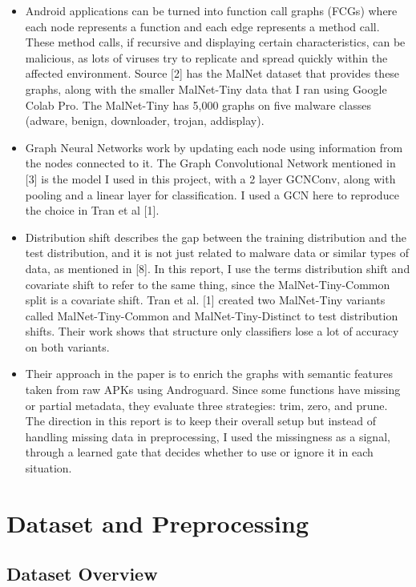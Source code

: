 \documentclass[12pt]{article}
\begin{document}
\begin{itemize}
    \item Android applications can be turned into function call graphs (FCGs) where each node represents a function and each edge represents a method call. These method calls, if recursive and displaying certain characteristics, can be malicious, as lots of viruses try to replicate and spread quickly within the affected environment. Source [2] has the MalNet dataset that provides these graphs, along with the smaller MalNet-Tiny data that I ran using Google Colab Pro. The MalNet-Tiny has 5,000 graphs on five malware classes (adware, benign, downloader, trojan, addisplay).
    \item Graph Neural Networks work by updating each node using information from the nodes connected to it. The Graph Convolutional Network mentioned in [3] is the model I used in this project, with a 2 layer GCNConv, along with pooling and a linear layer for classification. I used a GCN here to reproduce the choice in Tran et al [1].
    \item Distribution shift describes the gap between the training distribution and the test distribution, and it is not just related to malware data or similar types of data, as mentioned in [8]. In this report, I use the terms distribution shift and covariate shift to refer to the same thing, since the MalNet-Tiny-Common split is a covariate shift. Tran et al. [1] created two MalNet-Tiny variants called MalNet-Tiny-Common and MalNet-Tiny-Distinct to test distribution shifts. Their work shows that structure only classifiers lose a lot of accuracy on both variants.
    \item Their approach in the paper is to enrich the graphs with semantic features taken from raw APKs using Androguard. Since some functions have missing or partial metadata, they evaluate three strategies: trim, zero, and prune. The direction in this report is to keep their overall setup but instead of handling missing data in preprocessing, I used the missingness as a signal, through a learned gate that decides whether to use or ignore it in each situation. 
\end{itemize}

\section{Dataset and Preprocessing}

\subsection{Dataset Overview}
\end{document}
